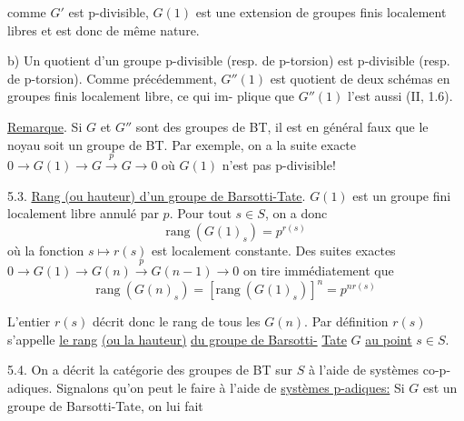 
comme $G'$ est p-divisible, $G(1)$ est une extension de groupes finis
localement libres et est donc de même nature.

b) Un quotient d'un groupe p-divisible (resp. de p-torsion) est
p-divisible (resp. de p-torsion). Comme précédemment, $G''(1)$ est
quotient de deux schémas en groupes finis localement libre, ce qui im-%
plique que $G''(1)$ l'est aussi (II, 1.6).

\uline{Remarque}. Si $G$ et $G''$ sont des groupes de BT, il est en général
faux que le noyau soit un groupe de BT. Par exemple, on a la suite
exacte $0 \to G(1) \to G \xrightarrow{p} G \to 0$ où $G(1)$ n'est pas p-divisible!

5.3. \uline{Rang (ou hauteur) d'un groupe de Barsotti-Tate}. $G(1)$ est un
groupe fini localement libre annulé par $p$. Pour tout $s \in S$, on a
donc
\[ \mathrm{rang}\ (G(1)_{s}) = p^{r(s)} \]
où la fonction $s \mapsto r(s)$ est localement constante. Des suites exactes
$0 \to G(1) \to G(n) \xrightarrow{p} G(n-1) \to 0$ on tire immédiatement que
\[ \mathrm{rang}\ (G(n)_{s}) = [\mathrm{rang}\ (G(1)_{s})]^{n} = p^{nr(s)} \]

L'entier $r(s)$ décrit donc le rang de tous les $G(n)$. Par
définition $r(s)$ s'appelle \uline{le rang} \uline{(ou la hauteur)} \uline{du groupe de Barsotti-}
\uline{Tate} $G$ \uline{au point} $s \in S$.

5.4. On a décrit la catégorie des groupes de BT sur $S$ à l'aide
de systèmes co-p-adiques. Signalons qu'on peut le faire à l'aide de
\uline{systèmes p-adiques:} Si $G$ est un groupe de Barsotti-Tate, on lui fait

